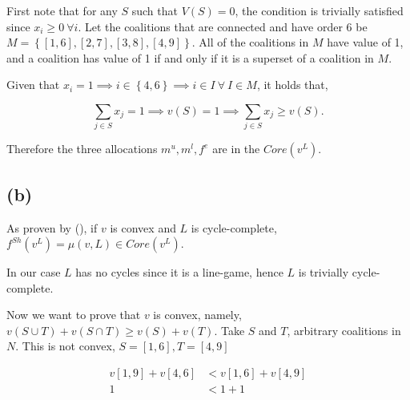 \documentclass[american]{scrartcl}
\newcommand{\set}[1]{\left\{#1\right\}}
\begin{document}
First note that for any $S$ such that $V(S) = 0$, the condition is trivially satisfied since $x_i \geq 0 \ \forall i$. Let the coalitions that are connected and have order 6 be $M = \set{[1, 6], [2, 7], [3, 8], [4, 9]}$. All of the coalitions in $M$ have value of 1, and a coalition has value of 1 if and only if it is a superset of a coalition in $M$.

Given that $x_i = 1 \implies i \in \set{4, 6} \implies i \in I \  \forall \ I \in M$, it holds that,

\begin{equation}
    \sum_{j \in S} x_j = 1 \implies v(S) = 1 \implies \sum_{j \in S} x_j \geq v(S).
\end{equation}

Therefore the three allocations $m^u, m^l, f^e$ are in the $Core(v^L)$.

\subsection*{(b)}

As proven by \citeauthor{borm} (\citeyear{borm}), if $v$ is convex and $L$ is cycle-complete, $f^{Sh}(v^L) = \mu(v, L) \in Core(v^L)$.

In our case $L$ has no cycles since it is a line-game, hence $L$ is trivially cycle-complete.

Now we want to prove that $v$ is convex, namely, $v(S \cup T) + v(S \cap T) \geq v(S) + v(T)$. Take $S$ and $T$, arbitrary coalitions in $N$.
This is not convex, $S = [1, 6], T = [4, 9]$

\begin{equation}
    \begin{split}
        v[1, 9] + v[4, 6] &< v[1, 6] + v[4, 9] \\
        1 &< 1+ 1
    \end{split}
\end{equation}

\newpage
\printbibliography
\end{document}
